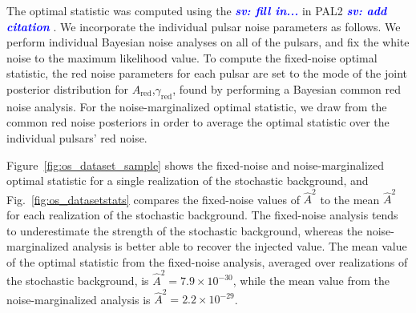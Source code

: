 \documentclass[twocolumn,aps,prd,superscriptaddress]{revtex4-1}
\newcommand{\sv}[1]{\textcolor{blue}{\it{\textbf{sv: #1}}} }
\begin{document}
The optimal statistic was computed using the \sv{fill in...} in PAL2 \sv{add citation}. 
We incorporate the individual pulsar noise parameters as follows. 
We perform individual Bayesian noise analyses on all of the pulsars, and 
fix the white noise to the maximum likelihood value. 
To compute the fixed-noise optimal statistic, 
the red noise parameters for each pulsar are set to the mode of 
the joint posterior distribution for $A_\mathrm{red}$,$\gamma_\mathrm{red}$, 
found by performing a Bayesian common red noise analysis. 
For the noise-marginalized optimal statistic, we draw from 
the common red noise posteriors in order to average the optimal statistic over 
the individual pulsars' red noise.

Figure~\ref{fig:os_dataset_sample} shows the fixed-noise and noise-marginalized 
optimal statistic for a single realization of the stochastic background, 
and Fig.~\ref{fig:os_datasetstats} compares the fixed-noise values of $\hat{A}^2$ 
to the mean $\hat{A}^2$ for each realization of the stochastic background. 
The fixed-noise analysis tends to underestimate the strength of the stochastic background, 
whereas the noise-marginalized analysis is better able to recover the injected value. 
The mean value of the optimal statistic from the fixed-noise analysis, 
averaged over realizations of the stochastic background, is $\hat{A}^2 = 7.9 \times 10^{-30}$, 
while the mean value from the noise-marginalized analysis is $\hat{A}^2 = 2.2 \times 10^{-29}$.
\end{document}
